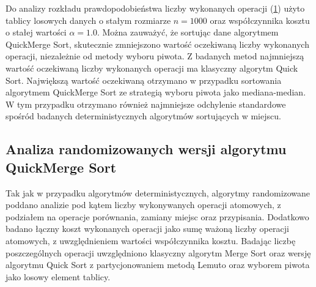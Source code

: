 Do analizy rozkładu prawdopodobieństwa liczby wykonanych operacji (\ref{fig:quick-merge-sort-deterministic-pivot-density}) użyto tablicy losowych danych o stałym rozmiarze $n = 1000$ oraz współczynnika kosztu o stałej wartości $\alpha = 1.0$. 
Można zauważyć, że sortując dane algorytmem QuickMerge Sort, skutecznie zmniejszono wartość oczekiwaną liczby wykonanych operacji, niezależnie od metody wyboru piwota. Z badanych metod najmniejszą wartość oczekiwaną liczby wykonanych operacji ma klasyczny algorytm Quick Sort. Największą wartość oczekiwaną otrzymano w przypadku sortowania algorytmem QuickMerge Sort ze strategią wyboru piwota jako mediana-median. W tym przypadku otrzymano również najmniejsze odchylenie standardowe spośród badanych deterministycznych algorytmów sortujących w miejscu.\\

\begin{figure}[]
	\centering
	
	\caption[]{}
	\label{fig:quick-merge-sort-deterministic-pivot-density}
\end{figure}

\begin{figure}[]
	\centering
	
	\caption[]{}
	\label{fig:quick-merge-sort-deterministic-pivot-cost-factor}
\end{figure}

\begin{figure}[]
	\centering
	
	\caption[]{}
	\label{fig:quick-merge-sort-deterministic-pivot-random}
\end{figure}

\subsection{Analiza randomizowanych wersji algorytmu QuickMerge Sort}
Tak jak w przypadku algorytmów deterministycznych, algorytmy randomizowane poddano analizie pod kątem liczby wykonywanych operacji atomowych, z podziałem na operacje porównania, zamiany miejsc oraz przypisania. Dodatkowo badano łączny koszt wykonanych operacji jako sumę ważoną liczby operacji atomowych, z uwzględnieniem wartości współczynnika kosztu. Badając liczbę poszczególnych operacji uwzględniono klasyczny algorytm Merge Sort oraz wersję algorytmu Quick Sort z partycjonowaniem metodą Lemuto oraz wyborem piwota jako losowy element tablicy.\\

